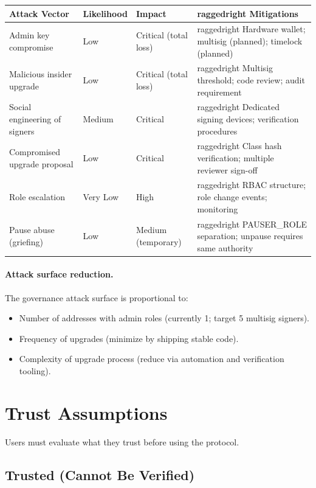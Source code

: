 \begin{center}
\begin{tabularx}{\textwidth}{l l l >{raggedright\arraybackslash}X}
\toprule
\textbf{Attack Vector} & \textbf{Likelihood} & \textbf{Impact} & \textbf{Mitigations} \\
\midrule
Admin key compromise & Low & Critical (total loss) & Hardware wallet; multisig (planned); timelock (planned) \\
Malicious insider upgrade & Low & Critical (total loss) & Multisig threshold; code review; audit requirement \\
Social engineering of signers & Medium & Critical & Dedicated signing devices; verification procedures \\
Compromised upgrade proposal & Low & Critical & Class hash verification; multiple reviewer sign-off \\
Role escalation & Very Low & High & RBAC structure; role change events; monitoring \\
Pause abuse (griefing) & Low & Medium (temporary) & PAUSER\_ROLE separation; unpause requires same authority \\
\bottomrule
\end{tabularx}
\end{center}

\paragraph{Attack surface reduction.}
The governance attack surface is proportional to:
\begin{itemize}
\item Number of addresses with admin roles (currently 1; target 5 multisig signers).
\item Frequency of upgrades (minimize by shipping stable code).
\item Complexity of upgrade process (reduce via automation and verification tooling).
\end{itemize}


\section{Trust Assumptions}

Users must evaluate what they trust before using the protocol.

\subsection{Trusted (Cannot Be Verified)}

